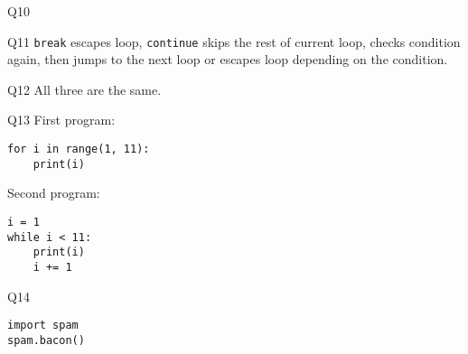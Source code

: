 \documentclass[a4paper,11pt]{scrartcl}
\begin{document}
\begin{labeling}{Q10}
  \item[Q11]
  \lstinline{break} escapes loop, \lstinline{continue} skips the rest of current loop, checks condition again, then jumps to the next loop or escapes loop depending on the condition.

  \item[Q12]
  All three are the same.

  \item[Q13]
  First program:
  \begin{lstlisting}
for i in range(1, 11):
    print(i)
  \end{lstlisting}
  Second program:
  \begin{lstlisting}
i = 1
while i < 11:
    print(i)
    i += 1
  \end{lstlisting}

  \item[Q14]
  \begin{lstlisting}
import spam
spam.bacon()
  \end{lstlisting}
\end{labeling}
\end{document}
